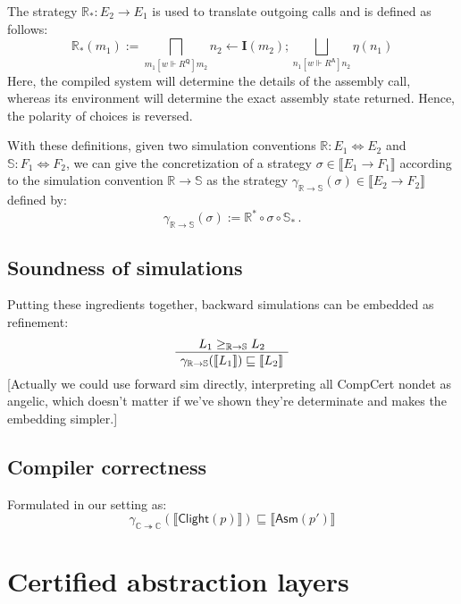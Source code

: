 \documentclass[format=sigplan,authordraft]{acmart}
\newcommand{\kw}[1]{\ensuremath{\mathsf{#1}}}
\newcommand{\ifr}[1]{\mathrel{[{#1}]}}
\begin{document}
The strategy $\mathbb{R}_* : E_2 \rightarrow E_1$
is used to translate outgoing calls
and is defined as follows:
\[
    \mathbb{R}_*(m_1) :=
       \bigsqcap_{m_1 \ifr{w \Vdash R^\kw{Q}} m_2}
       n_2 \leftarrow \mathbf{I}(m_2) ;
       \bigsqcup_{n_1 \ifr{w \Vdash R^\kw{A}} n_2}
       \eta(n_1)
\]
Here,
the compiled system will determine
the details of the assembly call,
whereas its environment will determine
the exact assembly state returned.
Hence, the polarity of choices is reversed.

With these definitions,
given two simulation conventions
$\mathbb{R} : E_1 \Leftrightarrow E_2$ and
$\mathbb{S} : F_1 \Leftrightarrow F_2$,
we can give the concretization of a strategy
$\sigma \in \llbracket E_1 \rightarrow F_1 \rrbracket$
according to the simulation convention
$\mathbb{R} \rightarrow \mathbb{S}$
as the strategy
$\gamma_{\mathbb{R} \rightarrow \mathbb{S}}(\sigma) \in
  \llbracket E_2 \rightarrow F_2 \rrbracket$
defined by:
\[
    \gamma_{\mathbb{R} \rightarrow \mathbb{S}}(\sigma) :=
    \mathbb{R}^* \circ \sigma \circ \mathbb{S}_* \,.
\]


\subsection{Soundness of simulations} %

Putting these ingredients together,
backward simulations can be embedded as refinement:
\[
    \AxiomC{$L_1 \ge_{\mathbb{R} \rightarrow \mathbb{S}} L_2$}
    \UnaryInfC{$\gamma_{\mathbb{R} \rightarrow \mathbb{S}}
                (\llbracket L_1 \rrbracket) \sqsubseteq
                \llbracket L_2 \rrbracket$}
    \DisplayProof
\]
[Actually we could use forward sim directly,
interpreting all CompCert nondet as angelic,
which doesn't matter if we've shown they're determinate
and makes the embedding simpler.]


\subsection{Compiler correctness} %

Formulated in our setting as:
\[
    \gamma_{\mathbb{C} \twoheadrightarrow \mathbb{C}}
          (\llbracket \kw{Clight}(p) \rrbracket) \sqsubseteq
    \llbracket \kw{Asm}(p') \rrbracket
\]



\section{Certified abstraction layers} %
\end{document}
